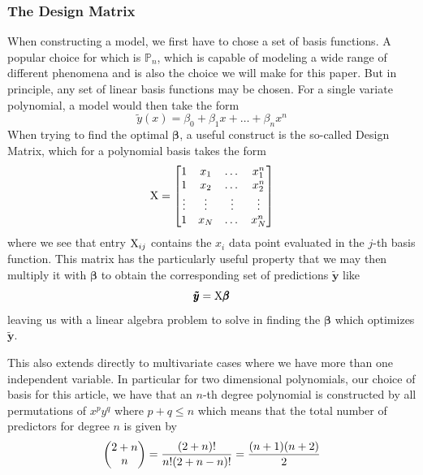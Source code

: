 \documentclass[reprint, english, nofootinbib]{revtex4-2}
\begin{document}
        \subsubsection{The Design Matrix}
            \noindent
            When constructing a model, we first have to chose a set of basis functions. A popular choice for which is $\mathbb P_n$, which is capable of modeling a wide range of different phenomena and is also the choice we will make for this paper. But in principle, any set of linear basis functions may be chosen.
            For a single variate polynomial, a model would then take the form
            \begin{equation}
                \tilde y (x) = \beta_0 + \beta_1 x+ \dots + \beta_n x^n
            \end{equation}
            When trying to find the optimal $\pmb \beta$, a useful construct is the so-called Design Matrix, which for a polynomial basis takes the form
            \begin{equation}
                \textup{X} = \qty[
                \begin{matrix}
                    1 & x_1 & \dots & x_1^n \\
                    1 & x_2 & \dots & x_2^n \\
                    \vdots & \vdots & \vdots & \vdots \\
                    1 & x_N & \dots & x_N^n
                \end{matrix}
                ]
            \end{equation}
            where we see that entry $\textup{X}_{ij}$ contains the $x_i$ data point evaluated in the $j$-th basis function. This matrix has the particularly useful property that we may then multiply it with $\pmb \beta$ to obtain the corresponding set of predictions $\pmb{\tilde y}$ like
            \begin{equation}
                \pmb{\tilde y} = \textup{X}\pmb \beta
            \end{equation}
            leaving us with a linear algebra problem to solve in finding the $\pmb\beta$ which optimizes $\pmb{\tilde y}$.

            This also extends directly to multivariate cases where we have more than one independent variable. In particular for two dimensional polynomials, our choice of basis for this article, we have that an $n$-th degree polynomial is constructed by all permutations of $x^p y^q$ where $p+q \leq n$ which means that the total number of predictors for degree $n$ is given by
            \begin{equation}\label{eqn:number of predictors wrt complexity}
                \qty(
                \begin{matrix}
                    2 + n \\ n
                \end{matrix}
                )
                =\frac{(2+n)!}{n!(2+n-n)!} = \frac{(n+1)(n+2)}{2}
            \end{equation}
\end{document}
